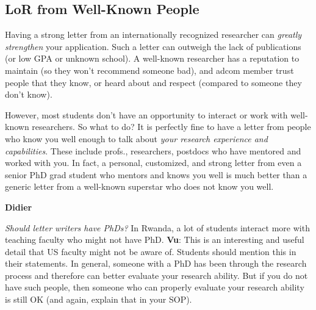 \documentclass[oneside,11pt,dvipsnames]{book}
\newenvironment{commentbox}[1][]{
  \small
  \begin{mybox}
    {\small \textbf{#1}}
  }{
  \end{mybox}
}
\begin{document}
\subsection{LoR from Well-Known People}\label{sec:famous-lor} 
 Having a strong letter from an internationally recognized researcher can \emph{greatly strengthen} your application. Such a letter can outweigh the lack of publications (or low GPA or unknown school). A well-known researcher has a reputation to maintain (so they won't recommend someone bad), and adcom member trust people that they know, or heard about and respect (compared to someone they don't know).



However, most students don't have an opportunity to interact or work with well-known researchers.  
So what to do? It is perfectly fine to have a letter from people who know you well enough to talk about \emph{your research experience and capabilities}. These include profs., researchers, postdocs who have mentored and worked with you. In fact, a personal, customized, and strong letter from even a senior PhD grad student who mentors and knows you well is much better than a generic letter from a well-known superstar who does not know you well. 



\begin{commentbox}[Didier]
    \emph{Should letter writers have PhDs?}  In Rwanda, a lot of students interact more with teaching faculty who might not have PhD.
    \tcblower
    \textbf{Vu}: This is an interesting and useful detail that US faculty might not be aware of. Students should mention this in their statements. In general, someone with a PhD has been through the research process and therefore can better evaluate your research ability.  But if you do not have such people, then someone who can properly evaluate your research ability is still OK (and again, explain that in your SOP).
  \end{commentbox}
\end{document}

